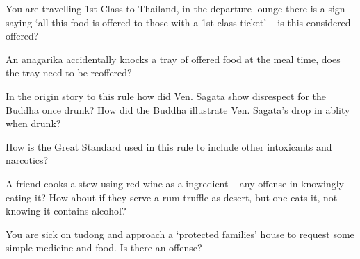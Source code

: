 \bigskip

You are travelling 1st Class to Thailand, in the departure lounge there is a
sign saying ‘all this food is offered to those with a 1st class ticket’ – is
this considered offered?

\bigskip

An anagarika accidentally knocks a tray of offered food at the meal time, does
the tray need to be reoffered?

\bigskip


In the origin story to this rule how did Ven. Sagata show disrespect for the
Buddha once drunk? How did the Buddha illustrate Ven. Sagata’s drop in ablity
when drunk?


\bigskip

How is the Great Standard used in this rule to include other intoxicants and narcotics?


\bigskip

A friend cooks a stew using red wine as a ingredient – any offense in knowingly
eating it? How about if they serve a rum-truffle as desert, but one eats it, not
knowing it contains alcohol?

\bigskip



You are sick on tudong and approach a ‘protected families’ house to request some
simple medicine and food. Is there an offense?

